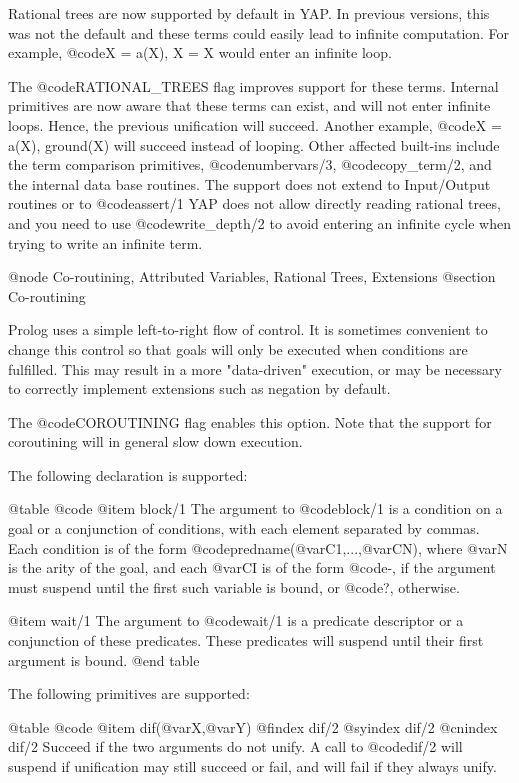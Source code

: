 {{{{{{{{{Rational trees are now supported by default in YAP. In previous
versions, this was not the default and these terms could easily lead
to infinite computation. For example, @code{X = a(X), X = X} would
enter an infinite loop.

The @code{RATIONAL_TREES} flag improves support for these
terms. Internal primitives are now aware that these terms can exist, and
will not enter infinite loops. Hence, the previous unification will
succeed. Another example, @code{X = a(X), ground(X)} will succeed
instead of looping. Other affected built-ins include the term comparison
primitives, @code{numbervars/3}, @code{copy_term/2}, and the internal
data base routines. The support does not extend to Input/Output routines
or to @code{assert/1} YAP does not allow directly reading
rational trees, and you need to use @code{write_depth/2} to avoid
entering an infinite cycle when trying to write an infinite term.

@node Co-routining, Attributed Variables, Rational Trees, Extensions
@section Co-routining

Prolog uses a simple left-to-right flow of control. It is sometimes
convenient to change this control so that goals will only be executed
when conditions are fulfilled. This may result in a more "data-driven"
execution, or may be necessary to correctly implement extensions such as
negation by default.

The @code{COROUTINING} flag enables this option. Note that the support for
coroutining  will in general slow down execution.

The following declaration is supported:

@table @code
@item block/1
The argument to @code{block/1} is a condition on a goal or a conjunction
of conditions, with each element separated by commas. Each condition is
of the form @code{predname(@var{C1},...,@var{CN})}, where @var{N} is the
arity of the goal, and each @var{CI} is of the form @code{-}, if the
argument must suspend until the first such variable is bound, or
@code{?}, otherwise.

@item wait/1
The argument to @code{wait/1} is a predicate descriptor or a conjunction
of these predicates. These predicates will suspend until their first
argument is bound.
@end table

The following primitives are supported:

@table @code
@item dif(@var{X},@var{Y})
@findex dif/2
@syindex dif/2
@cnindex dif/2
Succeed if the two arguments do not unify. A call to @code{dif/2} will
suspend if unification may still succeed or fail, and will fail if they
always unify.

}}}}}}}}}
